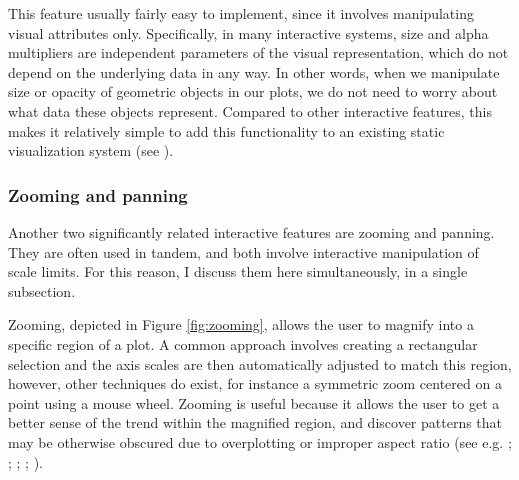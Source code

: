 \documentclass[
]{book}
\begin{document}
This feature usually fairly easy to implement, since it involves manipulating visual attributes only. Specifically, in many interactive systems, size and alpha multipliers are independent parameters of the visual representation, which do not depend on the underlying data in any way. In other words, when we manipulate size or opacity of geometric objects in our plots, we do not need to worry about what data these objects represent. Compared to other interactive features, this makes it relatively simple to add this functionality to an existing static visualization system (see ).

\subsubsection{Zooming and panning}\label{zooming-and-panning}

Another two significantly related interactive features are zooming and panning. They are often used in tandem, and both involve interactive manipulation of scale limits. For this reason, I discuss them here simultaneously, in a single subsection.

Zooming, depicted in Figure \ref{fig:zooming}, allows the user to magnify into a specific region of a plot. A common approach involves creating a rectangular selection and the axis scales are then automatically adjusted to match this region, however, other techniques do exist, for instance a symmetric zoom centered on a point using a mouse wheel. Zooming is useful because it allows the user to get a better sense of the trend within the magnified region, and discover patterns that may be otherwise obscured due to overplotting or improper aspect ratio (see e.g. ; ; ; ; ).
\end{document}
